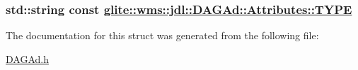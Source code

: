 \hypertarget{structglite_1_1wms_1_1jdl_1_1DAGAd_1_1Attributes_s0}{
\subsubsection[TYPE]{\setlength{\rightskip}{0pt plus 5cm}std::string const \hyperlink{structglite_1_1wms_1_1jdl_1_1DAGAd_1_1Attributes_s0}{glite::wms::jdl::DAGAd::Attributes::TYPE}}}
\label{structglite_1_1wms_1_1jdl_1_1DAGAd_1_1Attributes_s0}




The documentation for this struct was generated from the following file:\begin{CompactItemize}
\item 
\hyperlink{DAGAd_8h}{DAGAd.h}\end{CompactItemize}
